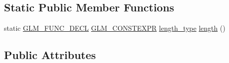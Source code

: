 \subsection*{Static Public Member Functions}
\begin{DoxyCompactItemize}
\item 
static \mbox{\hyperlink{setup_8hpp_ab2d052de21a70539923e9bcbf6e83a51}{G\+L\+M\+\_\+\+F\+U\+N\+C\+\_\+\+D\+E\+CL}} \mbox{\hyperlink{setup_8hpp_a08b807947b47031d3a511f03f89645ad}{G\+L\+M\+\_\+\+C\+O\+N\+S\+T\+E\+X\+PR}} \mbox{\hyperlink{structglm_1_1vec_3_014_00_01_t_00_01_q_01_4_af1c8f56963141951f4a4724b47e072d9}{length\+\_\+type}} \mbox{\hyperlink{structglm_1_1vec_3_014_00_01_t_00_01_q_01_4_ac83fdb652378185c944b11f5cf35744d}{length}} ()
\end{DoxyCompactItemize}
\subsection*{Public Attributes}
